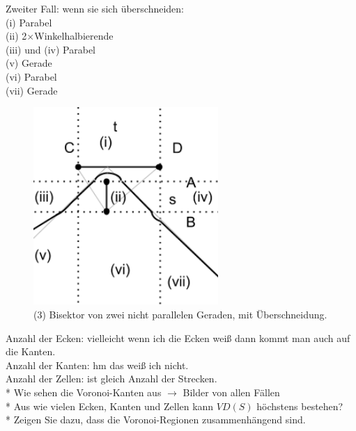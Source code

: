 Zweiter Fall: wenn sie sich überschneiden:\\
(i) Parabel\\
(ii) 2$\times$Winkelhalbierende\\
(iii) und (iv) Parabel\\
(v) Gerade\\
(vi) Parabel\\
(vii) Gerade\\

\begin{figure}[h]
\begin{center}
\includegraphics[width=7cm]{img/ssnpin.png}
\end{center}
\caption{(3) Bisektor von zwei nicht parallelen Geraden, mit Überschneidung.}
\label{fig:a5}
\end{figure}


Anzahl der Ecken: vielleicht wenn ich die Ecken weiß dann kommt man auch auf die Kanten.\\
Anzahl der Kanten: hm das weiß ich nicht.\\
Anzahl der Zellen: ist gleich Anzahl der Strecken.\\  

* Wie sehen die Voronoi-Kanten aus $\rightarrow$ Bilder von allen Fällen\\
* Aus wie vielen Ecken, Kanten und Zellen kann $VD(S)$ höchstens bestehen?\\
* Zeigen Sie dazu, dass die Voronoi-Regionen zusammenhängend sind.